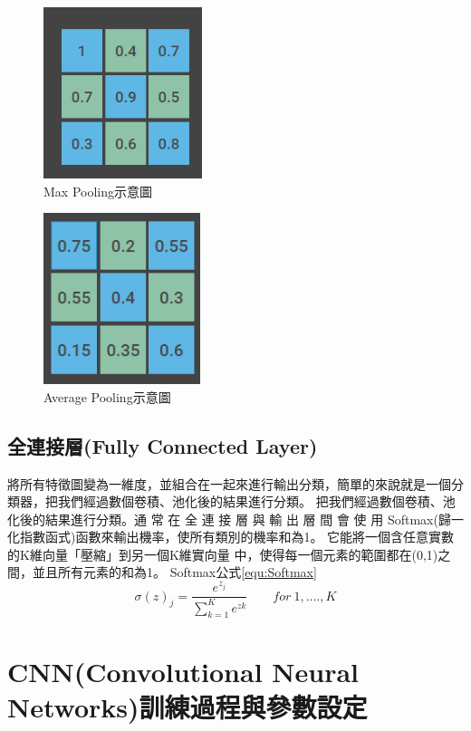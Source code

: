 \begin{figure}[H]
	\centerline{\includegraphics[height=5cm]{pic/poolinig 2.PNG}}
	\caption{Max Pooling示意圖}
	\label{fig:Max Pooling}
\end{figure}
\begin{figure}[H]
	\centerline{\includegraphics[height=5cm]{pic/pooling 3.PNG}}
	\caption{Average Pooling示意圖}
	\label{fig:Average Pooling}
\end{figure}


\subsection{全連接層(Fully Connected Layer)}
            將所有特徵圖變為一維度，並組合在一起來進行輸出分類，簡單的來說就是一個分類器，把我們經過數個卷積、池化後的結果進行分類。
            把我們經過數個卷積、池化後的結果進行分類。通 常 在 全 連 接 層 與 輸 出 層 間 會 使 用 Softmax(歸一化指數函式)函數來輸出機率，使所有類別的機率和為1。
            它能將一個含任意實數的K維向量「壓縮」到另一個K維實向量 中，使得每一個元素的範圍都在(0,1)之間，並且所有元素的和為1。
            Softmax公式\ref{equ:Softmax}
                    \begin{equation}
       \label{equ:Softmax}
        \sigma(z)_j=\frac{e^{z_j}}{\sum_{k=1}^{K}e^{zk}} \ \ \ \ \ \ \ \ \ for\ 1,....,K
        \end{equation}


\section{CNN(Convolutional Neural Networks)訓練過程與參數設定}
